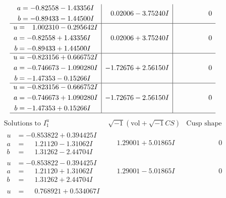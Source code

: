 \documentclass[1p]{elsarticle_modified}
\theoremstyle{definition}
\newcommand{\I}{\sqrt{-1}}
\begin{document}
$$\begin{array}{c|c|c}
\begin{aligned}
a &= -0.82558 - 1.43356 I \\
b &= -0.89433 - 1.44500 I\end{aligned}
 & \phantom{-}0.02006 - 3.75240 I & \phantom{-0.000000 } 0 \\ \hline\begin{aligned}
u &= \phantom{-}1.002310 - 0.295642 I \\
a &= -0.82558 + 1.43356 I \\
b &= -0.89433 + 1.44500 I\end{aligned}
 & \phantom{-}0.02006 + 3.75240 I & \phantom{-0.000000 } 0 \\ \hline\begin{aligned}
u &= -0.823156 + 0.666752 I \\
a &= -0.746673 - 1.090280 I \\
b &= -1.47353 - 0.15266 I\end{aligned}
 & -1.72676 + 2.56150 I & \phantom{-0.000000 } 0 \\ \hline\begin{aligned}
u &= -0.823156 - 0.666752 I \\
a &= -0.746673 + 1.090280 I \\
b &= -1.47353 + 0.15266 I\end{aligned}
 & -1.72676 - 2.56150 I & \phantom{-0.000000 } 0\\
 \hline 
 \end{array}$$\newpage$$\begin{array}{c|c|c}  
\text{Solutions to }I^u_{1}& \I (\text{vol} + \sqrt{-1}CS) & \text{Cusp shape}\\
 \hline 
\begin{aligned}
u &= -0.853822 + 0.394425 I \\
a &= \phantom{-}1.21120 - 1.31062 I \\
b &= \phantom{-}1.31262 - 2.44704 I\end{aligned}
 & \phantom{-}1.29001 + 5.01865 I & \phantom{-0.000000 } 0 \\ \hline\begin{aligned}
u &= -0.853822 - 0.394425 I \\
a &= \phantom{-}1.21120 + 1.31062 I \\
b &= \phantom{-}1.31262 + 2.44704 I\end{aligned}
 & \phantom{-}1.29001 - 5.01865 I & \phantom{-0.000000 } 0 \\ \hline\begin{aligned}
u &= \phantom{-}0.768921 + 0.534067 I \\

\end{aligned}
\end{array}$$
\end{document}
